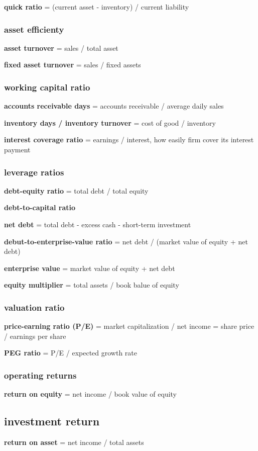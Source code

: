 \documentclass[10pt]{article}
\theoremstyle{break}
\begin{document}
\textbf{quick ratio} = (current asset - inventory) / current liability

\subsubsection{asset efficienty}
\textbf{asset turnover} = sales / total asset 

\textbf{fixed asset turnover} = sales / fixed assets

\subsubsection{working capital ratio}
\textbf{accounts receivable days} = accounts receivable / average daily sales 

\textbf{inventory days / inventory turnover} = cost of good / inventory

\textbf{interest coverage ratio} = earnings / interest, how easily firm cover its interest payment 

\subsubsection{leverage ratios}
\textbf{debt-equity ratio} = total debt / total equity 

\textbf{debt-to-capital ratio}

\textbf{net debt} = total debt - excess cash - short-term investment 

\textbf{debut-to-enterprise-value ratio} = net debt / (market value of equity + net debt)

\textbf{enterprise value} = market value of equity + net debt

\textbf{equity multiplier} = total assets / book balue of equity

\subsubsection{valuation ratio}
\textbf{price-earning ratio (P/E)} = market capitalization / net income = share price / earnings per share

\textbf{PEG ratio} = P/E / expected growth rate

\subsubsection{operating returns}
\textbf{return on equity} = net income / book value of equity 

\subsection{investment return}
\textbf{return on asset} = net income / total assets
\end{document}
